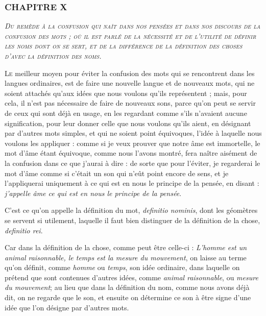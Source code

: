 \subsubsection{\centering \Large CHAPITRE X}
\begin{center}\emph{\large\scshape Du remède à la confusion qui naît dans nos pensées et dans nos discours de la confusion des mots ; où il est parlé de la nécessité et de l'utilité de définir les noms dont on se sert, et de la différence de la définition des choses d'avec la définition des noms.}\end{center}


	\lettrine{L}{e} meilleur moyen pour éviter la confusion des mots qui se rencontrent dans les langues ordinaires, est de faire une nouvelle langue et de nouveaux mots, qui ne soient attachés qu'aux idées que nous voulons qu'ils représentent ; mais, pour cela, il n'est pas nécessaire de faire de nouveaux sons, parce qu'on peut se servir de ceux qui sont déjà en usage, en les regardant comme s'ils n'avaient aucune signification, pour leur donner celle que nous voulons qu'ils aient, en désignant par d'autres mots simples, et qui ne soient point équivoques, l'idée à laquelle nous voulons les appliquer : comme si je veux prouver que notre âme est immortelle, le mot d'âme étant équivoque, comme nous l'avons montré, fera naître aisément de la confusion dans ce que j'aurai à dire : de sorte que pour l'éviter, je regarderai le mot d'âme comme si c'était un son qui n'eût point encore de sens, et je l'appliquerai uniquement à ce qui est en nous le principe de la pensée, en disant : \emph{j'appelle âme ce qui est en nous le principe de la pensée}.

C'est ce qu'on appelle la définition du mot, \emph{definitio nominis}, dont les géomètres se servent si utilement, laquelle il faut bien distinguer de la définition de la chose, \emph{definitio rei}.

Car dans la définition de la chose, comme peut être celle-ci : \emph{L'homme est un animal raisonnable, le temps est la mesure du mouvement}, on laisse au terme qu'on définit, comme \emph{homme} ou \emph{temps}, son idée ordinaire, dans laquelle on prétend que sont contenues d'autres idées, comme \emph{animal raisonnable}, ou \emph{mesure du mouvement}; au lieu que dans la définition du nom, comme nous avons déjà dit, on ne regarde que le son, et ensuite on détermine ce son à être signe d'une idée que l'on désigne par d'autres mots.

